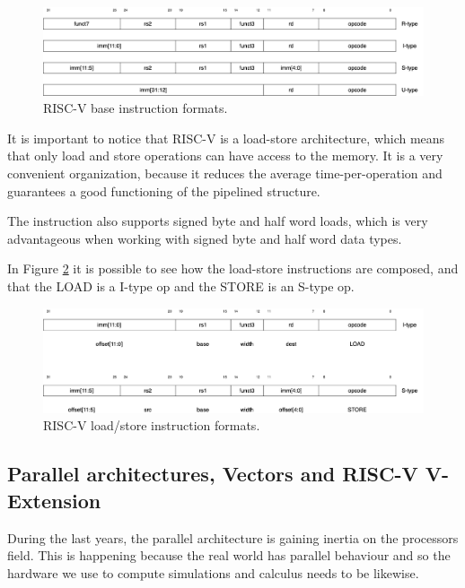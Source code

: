 \begin{figure}[H]
    \centering
    \includegraphics[scale = 0.27]{Chapter_1/img/riscv-base-instruction-formats.png}
    \caption{RISC-V base instruction formats. \cite{RISC-V-Instruction-Set-Manual}}
    \label{riscv-base-instruction-formats}
\end{figure}

It is important to notice that RISC-V is a load-store architecture, which means that only load and store operations can have access to the memory.
It is a very convenient organization, because it reduces the average time-per-operation and guarantees a good functioning of the pipelined structure.

The instruction also supports signed byte and half word loads, which is very advantageous when working with signed byte and half word data types.

In Figure \ref{riscv-load-store} it is possible to see how the load-store instructions are composed, and that the LOAD is a I-type op and the STORE is an S-type op.

\begin{figure}[H]
    \centering
    \includegraphics[scale = 0.27]{Chapter_1/img/riscv-load-store.png}
    \caption{RISC-V load/store instruction formats. \cite{RISC-V-Instruction-Set-Manual}}
    \label{riscv-load-store}
\end{figure}


\subsection{Parallel architectures, Vectors and RISC-V V-Extension}
During the last years, the parallel architecture is gaining inertia on the processors field. This is happening because the real world has parallel behaviour and so the hardware we use to compute simulations and calculus needs to be likewise.\cite{Parallel-Computing}

